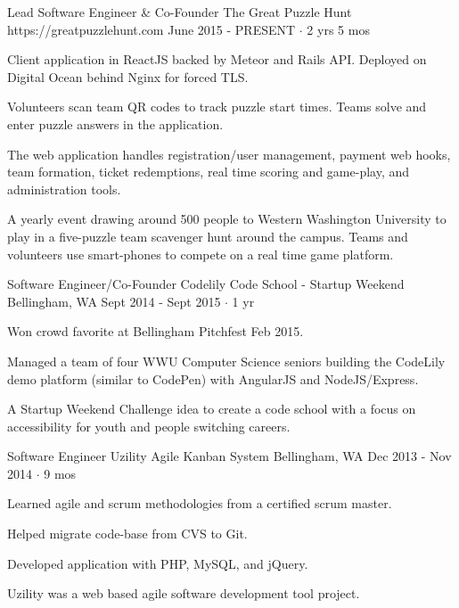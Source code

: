 \documentclass[11pt, a4paper]{awesome-cv}
\begin{document}
\newpage
\begin{cventries}

  \cventry
    {Lead Software Engineer \& Co-Founder} %
    {The Great Puzzle Hunt} %
    {https://greatpuzzlehunt.com} %
    {June 2015 - PRESENT $\cdot$ 2 yrs 5 mos} %
    {
      \begin{cvitems} %
        \item Client application in ReactJS backed by Meteor and Rails API. Deployed on Digital Ocean behind Nginx for forced TLS.
        \item Volunteers scan team QR codes to track puzzle start times. Teams solve and enter puzzle answers in the application.
        \item The web application handles registration/user management, payment web hooks, team formation, ticket redemptions, real time scoring and game-play, and administration tools.
      \end{cvitems}
    }
    {
      A yearly event drawing around 500 people to Western Washington University to play in a five-puzzle team scavenger hunt around the campus.
      Teams and volunteers use smart-phones to compete on a real time game platform.
    }

  \cventry
    {Software Engineer/Co-Founder} %
    {Codelily Code School - Startup Weekend} %
    {Bellingham, WA} %
    {Sept 2014 - Sept 2015 $\cdot$ 1 yr} %
    {
      \begin{cvitems} %
        \item Won crowd favorite at Bellingham Pitchfest Feb 2015.
        \item Managed a team of four WWU Computer Science seniors building the CodeLily demo platform (similar to CodePen) with AngularJS and NodeJS/Express.
      \end{cvitems}
    }
    {A Startup Weekend Challenge idea to create a code school with a focus on accessibility for youth and people switching careers.}

  \cventry
    {Software Engineer} %
    {Uzility Agile Kanban System} %
    {Bellingham, WA} %
    {Dec 2013 - Nov 2014 $\cdot$ 9 mos} %
    {
      \begin{cvitems} %
        \item Learned agile and scrum methodologies from a certified scrum master.
        \item Helped migrate code-base from CVS to Git.
        \item Developed application with PHP, MySQL, and jQuery.
      \end{cvitems}
    }
    {Uzility was a web based agile software development tool project.}
\end{cventries}
\end{document}
